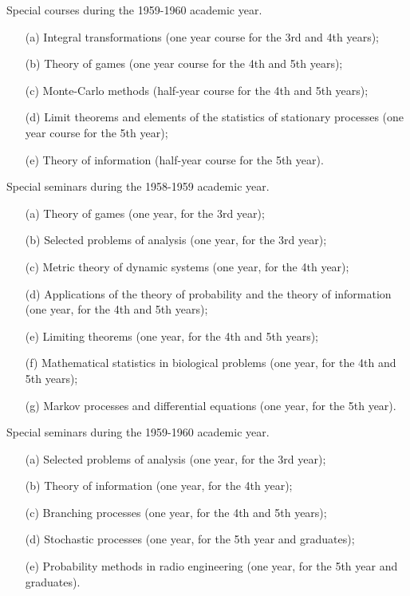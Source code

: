 Special courses during the 1959-1960 academic year. 
\begin{itemize}
\item[(a)] Integral transformations (one year course for the 3rd and
  4th years);

\item[(b)] Theory of games (one year course for the 4th and 5th years);

\item[(c)] Monte-Carlo methods (half-year course for the 4th and 5th years);

\item[(d)] Limit theorems and elements of the statistics of stationary
  processes (one year course for the 5th year);

\item[(e)] Theory of information (half-year course for the 5th year).
\end{itemize}

Special seminars during the 1958-1959 academic year. 
\begin{itemize}
\item[(a)] Theory of games (one year, for the 3rd year);

\item[(b)] Selected problems of analysis (one year, for the 3rd year);

\item[(c)] Metric theory of dynamic systems (one year, for the 4th year);

\item[(d)] Applications of the theory of probability and the theory of
  information (one year, for the 4th and 5th years); 

\item[(e)] Limiting theorems (one year, for the 4th and 5th years);

\item[(f)] Mathematical statistics in biological problems (one year,
  for the 4th and 5th years);

\item[(g)] Markov processes and differential equations (one year, for
  the 5th year).
\end{itemize}

Special seminars during the 1959-1960 academic year.
\begin{itemize}
\item[(a)] Selected problems of analysis (one year, for the 3rd year);

\item[(b)] Theory of information (one year, for the 4th year);

\item[(c)] Branching processes (one year, for the 4th and 5th years);

\item[(d)] Stochastic processes (one year, for the 5th year and graduates);

\item[(e)] Probability methods in radio engineering (one year, for the
  5th year and graduates).
\end{itemize}


